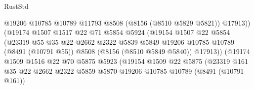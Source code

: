 \begin{lexlean}{RustStd}
\begin{coremodule}
                                      @19206
                                      @10785
                                      @10789
                                      @11793
                                      @8508
                                      (@8156 (@8510 @5829 @5821))
                                      @17913))
                                  (@19174
                                    @1507
                                    @1517
                                    @22
                                    @71
                                    @5854
                                    @5924
                                    (@19154
                                      @1507
                                      @22
                                      @5854
                                      (@23319
                                        @55
                                        @35
                                        @22
                                        @2662
                                        @2322
                                        @5839
                                        @5849
                                        @19206
                                        @10785
                                        @10789
                                        (@8491 (@10791 @55))
                                        @8508
                                        (@8156 (@8510 @5849 @5840))
                                        @17913))
                                    (@19174
                                      @1509
                                      @1516
                                      @22
                                      @70
                                      @5875
                                      @5923
                                      (@19154
                                        @1509
                                        @22
                                        @5875
                                        (@23319
                                          @161
                                          @35
                                          @22
                                          @2662
                                          @2322
                                          @5859
                                          @5870
                                          @19206
                                          @10785
                                          @10789
                                          (@8491 (@10791 @161))

\end{coremodule}
\end{lexlean}
